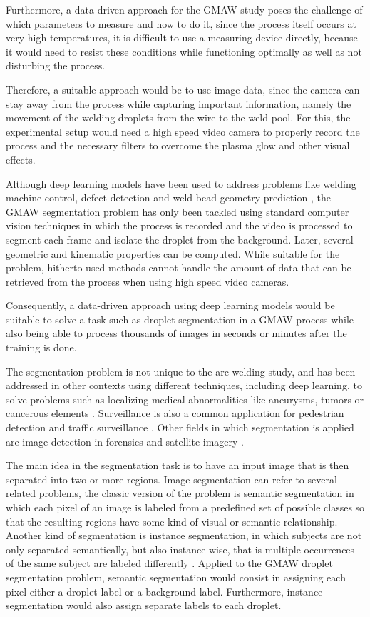 \begin{intro}
Furthermore, a data-driven approach for the GMAW study poses the challenge of which parameters to measure and how to do it, since the process itself occurs at very high temperatures, it is difficult to use a measuring device directly, because it would need to resist these conditions while functioning optimally as well as not disturbing the process.

Therefore, a suitable approach would be to use image data, since the camera can stay away from the process while capturing important information, namely the movement of the welding droplets from the wire to the weld pool. For this, the experimental setup would need a high speed video camera to properly record the process and the necessary filters to overcome the plasma glow and other visual effects. 

Although deep learning models have been used to address problems like welding machine control, defect detection and weld bead geometry prediction \cite{Gunther, Zhang, bead}, the GMAW segmentation problem has only been tackled using standard computer vision techniques \cite{Ray, Zhai} in which the process is recorded and the video is processed to segment each frame and isolate the droplet from the background. Later, several geometric and kinematic properties can be computed. While suitable for the problem, hitherto used methods cannot handle the amount of data that can be retrieved from the process when using high speed video cameras. 

Consequently, a data-driven approach using deep learning models would be suitable to solve a task such as droplet segmentation in a GMAW process while also being able to process thousands of images in seconds or minutes after the training is done.

The segmentation problem is not unique to the arc welding study, and has been addressed in other contexts using different techniques, including deep learning, to solve problems such as localizing medical abnormalities \cite{medical-image-survey} like aneurysms, tumors or cancerous elements \cite{aneurysm, tumor, cancer}. Surveillance is also a common application for pedestrian detection and traffic surveillance \cite{pedestrians, traffic}. Other fields in which segmentation is applied are image detection in forensics \cite{forensics1, forensics2, forensics3} and satellite imagery \cite{satellite}.

The main idea in the segmentation task is to have an input image that is then separated into two or more regions. Image segmentation can refer to several related problems, the classic version of the problem is semantic segmentation in which each pixel of an image is labeled from a predefined set of possible classes so that the resulting regions have some kind of visual or semantic relationship. Another kind of segmentation is instance segmentation, in which subjects are not only separated semantically, but also instance-wise, that is multiple occurrences of the same subject are labeled differently \cite{segmentation-survey}. Applied to the GMAW droplet segmentation problem, semantic segmentation would consist in assigning each pixel either a droplet label or a background label. Furthermore, instance segmentation would also assign separate labels to each droplet.


\end{intro}
